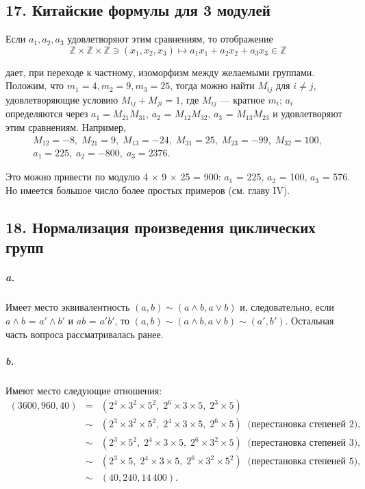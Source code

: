 {\subsection{\normalsize{17. Китайские формулы для 3 модулей}}

Если $a_1, a_2, a_3$ удовлетворяют этим сравнениям, то отображение
\begin{equation*}
\mathbb{Z} \times \mathbb{Z} \times \mathbb{Z} \ni (x_{1},x_{2},x_{3}) \mapsto a_{1}x_{1} + a_{2}x_{2} + a_{3}x_{3} \in \mathbb {Z}
\end{equation*}




\noindent дает, при переходе к частному, изоморфизм между желаемыми группами. Положим, что $m_1 = 4, m_2 = 9, m_3 = 25$, тогда можно найти $M_{ij}$
для $i \neq j$, удовлетворяющие условию $M_{ij} + M_{ji} = 1$, где $M_{ij}$ — кратное
$m_{i}$; $a_i$ определяются через $a_1 = M_{21}M_{31}$, $a_2$ = $M_{12}M_{32}$, $a_3$ = $M_{13}M_{23}$ и
удовлетворяют этим сравнениям. Например,
\begin{gather*}
M_{12} = -8,\;M_{21} = 9,\;M_{13} = -24,\;M_{31} = 25,\;M_{23} = -99,\;M_{32} = 100, \\
a_1 = 225,\;a_2 = -800,\;a_3 = 2376.
\end{gather*}

\noindent Это можно привести по модулю 4 $\times$ 9 $\times$ 25 = 900: $a_1$ = 225, $a_2$ = 100,\linebreak
$a_3$ = 576. Но имеется большое число более простых примеров (см. главу IV).

\subsection{\normalsize{18. Нормализация произведения циклических групп}}

\subparagraph{a.} Имеет место эквивалентность $(a,b) \sim (a \wedge b, a \vee b)$ и, следовательно,
если $a \wedge b$ = $a' \wedge b'$ и $ab$ = $a'b'$, то $(a,b) \sim (a \wedge b, a \vee b) \sim (a',b')$. Остальная
часть вопроса рассматривалась ранее.

\subparagraph{b.} Имеют место следующие отношения:
\begin{eqnarray*}
(3600,960,40) &=&(2^4 \times 3^2 \times 5^2,\;2^6 \times 3 \times 5,\;2^3 \times 5)\\
              &\sim&(2^3 \times 3^2 \times 5^2,\;2^4 \times 3 \times 5,\;2^6 \times 5)\;\;\text{(перестановка степеней 2),}\\
              &\sim&(2^3 \times 5^2,\;2^4 \times 3 \times 5,\;2^6 \times 3^2 \times 5)\;\;\text{(перестановка степеней 3),}\\
              &\sim&(2^3 \times 5,\;2^4 \times 3 \times 5,\;2^6 \times 3^2 \times 5^2)\;\;\text{(перестановка степеней 5),}\\
              &\sim&(40,240,14\,400).
\end{eqnarray*}

}
